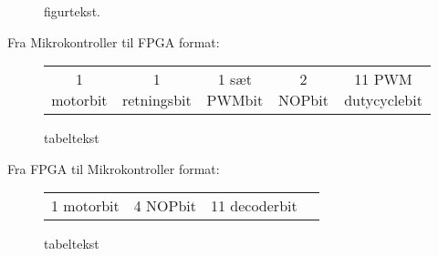 
\begin{figure}[!th]
\centering
\begin{tikzpicture}[node distance = 5 cm,scale=1]

\end{tikzpicture}
\caption[tekst i indholdsfortegnelsen]{figurtekst.}
\label{fig:FPGA_blok}
\end{figure}




Fra Mikrokontroller til FPGA format:
\begin{figure}[th!]
\centering
\begin{tabular}{c|c|c|c|c}
1 motorbit &1 retningsbit & 1 sæt PWMbit & 2 NOPbit & 11 PWM dutycyclebit

\end{tabular}
\captionsetup{type=figure}
\caption[tekst i indholdsfortegnelsen]{tabeltekst}
\label{tb:}
\end{figure}




Fra FPGA til Mikrokontroller format:
\begin{figure}[th!]
\centering
\begin{tabular}{c|c|c|c}
1 motorbit & 4 NOPbit & 11 decoderbit

\end{tabular}
\captionsetup{type=figure}
\caption[tekst i indholdsfortegnelsen]{tabeltekst}
\label{tb:}
\end{figure}
